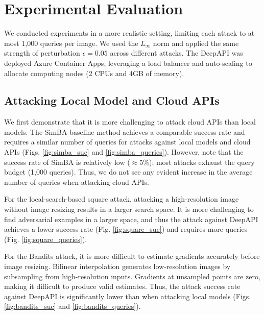 
\section{Experimental Evaluation}
\label{section_experimental_evaluation}

We conducted experiments in a more realistic setting, limiting each attack to at most 1,000 queries per image. We used the $L_{\infty}$ norm and applied the same strength of perturbation $\epsilon=0.05$ across different attacks. The DeepAPI was deployed Azure Container Apps, leveraging a load balancer and auto-scaling to allocate computing nodes (2 CPUs and 4GB of memory).



\subsection{Attacking Local Model and Cloud APIs}

We first demonstrate that it is more challenging to attack cloud APIs than local models. The SimBA baseline method achieves a comparable success rate and requires a similar number of queries for attacks against local models and cloud APIs (Figs. \ref{fig:simba_suc} and \ref{fig:simba_queries}). However, note that the success rate of SimBA is relatively low ($\approx 5\%$); most attacks exhaust the query budget (1,000 queries). Thus, we do not see any evident increase in the average number of queries when attacking cloud APIs.

For the local-search-based square attack, attacking a high-resolution image without image resizing results in a larger search space. It is more challenging to find adversarial examples in a larger space, and thus the attack against DeepAPI achieves a lower success rate (Fig. \ref{fig:square_suc}) and requires more queries (Fig. \ref{fig:square_queries}). 

For the Bandits attack, it is more difficult to estimate gradients accurately before image resizing. Bilinear interpolation generates low-resolution images by subsampling from high-resolution inputs. Gradients at unsampled points are zero, making it difficult to produce valid estimates. Thus, the attack success rate against DeepAPI is significantly lower than when attacking local models (Figs. \ref{fig:bandits_suc} and \ref{fig:bandits_queries}). 

